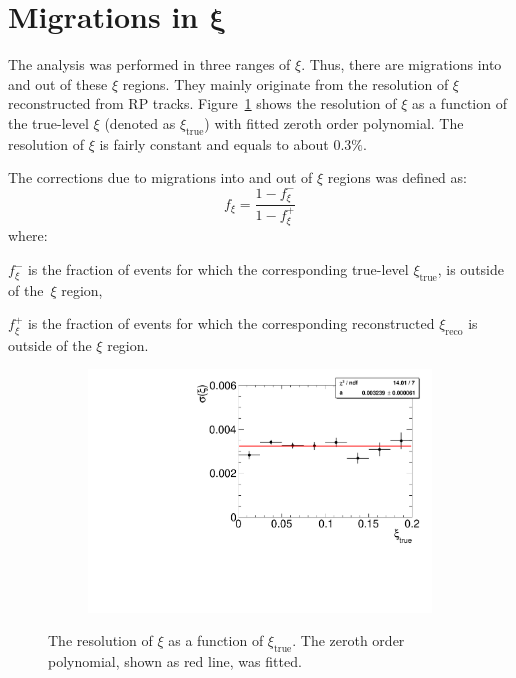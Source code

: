 \section[Migrations in $\xi$]{Migrations in $\mathbf{\xi}$}\label{section:star_xi}
The analysis was performed in three ranges of $\xi$. Thus, there are
migrations into and out of these $\xi$ regions. They mainly originate from the resolution of $\xi$ reconstructed from RP tracks. Figure~\ref{fig:xi_correction_resolution} shows the resolution of $\xi$ as a function of the true-level $\xi$ (denoted as $\xi_\textrm{true}$) with fitted zeroth order polynomial. The resolution of $\xi$ is fairly constant and equals to about $0.3\%$.

The corrections due to migrations into and out of  $\xi$ regions was defined as:
 \begin{equation}
 f_{\xi} = \frac{1-f_{\xi}^-}{1-f_{\xi}^+}
 \end{equation}
 where:
 \begin{description}
 	\item $f_{\xi}^-$ is the fraction of events for which the corresponding true-level $\xi_\textrm{true}$, is outside of the~$\xi$ region,
 	\item $f_{\xi}^+$  is the fraction of events for which the corresponding reconstructed $\xi_\textrm{reco}$ is outside of the $\xi$ region.
 \end{description}
 \begin{figure}[h!]
 	\centering
 	\begin{subfigure}{.49\textwidth}
 		\includegraphics[width=\textwidth,page=1]{chapters/chrgSTAR/img/xiMigration/RPresolution.pdf}
 	\end{subfigure}
 	\begin{minipage}{.49\textwidth}
 		\caption{The resolution of $\xi$ as a function of $\xi_\textrm{true}$. The zeroth order polynomial, shown as red line, was fitted.}
 		\label{fig:xi_correction_resolution}
 	\end{minipage}
 \end{figure}
